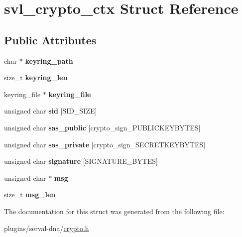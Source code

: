 \hypertarget{structsvl__crypto__ctx}{\section{svl\-\_\-crypto\-\_\-ctx Struct Reference}
\label{structsvl__crypto__ctx}
}
\subsection*{Public Attributes}
\begin{DoxyCompactItemize}
\item 
\hypertarget{structsvl__crypto__ctx_ad8980dd54ef8e577c38f1840a1a1460c}{char $\ast$ {\bfseries keyring\-\_\-path}}\label{structsvl__crypto__ctx_ad8980dd54ef8e577c38f1840a1a1460c}

\item 
\hypertarget{structsvl__crypto__ctx_a5a6d4a9d6a466047528b6c4fb9d408e1}{size\-\_\-t {\bfseries keyring\-\_\-len}}\label{structsvl__crypto__ctx_a5a6d4a9d6a466047528b6c4fb9d408e1}

\item 
\hypertarget{structsvl__crypto__ctx_a7ab514ea2330d07c03e9dd18924b5d3b}{keyring\-\_\-file $\ast$ {\bfseries keyring\-\_\-file}}\label{structsvl__crypto__ctx_a7ab514ea2330d07c03e9dd18924b5d3b}

\item 
\hypertarget{structsvl__crypto__ctx_a56a6ffa4afdbce4b218637cb1e554660}{unsigned char {\bfseries sid} \mbox{[}S\-I\-D\-\_\-\-S\-I\-Z\-E\mbox{]}}\label{structsvl__crypto__ctx_a56a6ffa4afdbce4b218637cb1e554660}

\item 
\hypertarget{structsvl__crypto__ctx_aa073486cf89574d65ef3c0660b3ec9c0}{unsigned char {\bfseries sas\-\_\-public} \mbox{[}crypto\-\_\-sign\-\_\-\-P\-U\-B\-L\-I\-C\-K\-E\-Y\-B\-Y\-T\-E\-S\mbox{]}}\label{structsvl__crypto__ctx_aa073486cf89574d65ef3c0660b3ec9c0}

\item 
\hypertarget{structsvl__crypto__ctx_a3f476ccc11a0c28552877358e6f64d30}{unsigned char {\bfseries sas\-\_\-private} \mbox{[}crypto\-\_\-sign\-\_\-\-S\-E\-C\-R\-E\-T\-K\-E\-Y\-B\-Y\-T\-E\-S\mbox{]}}\label{structsvl__crypto__ctx_a3f476ccc11a0c28552877358e6f64d30}

\item 
\hypertarget{structsvl__crypto__ctx_aa5a5a1490bff146660c77951fc0e2e98}{unsigned char {\bfseries signature} \mbox{[}S\-I\-G\-N\-A\-T\-U\-R\-E\-\_\-\-B\-Y\-T\-E\-S\mbox{]}}\label{structsvl__crypto__ctx_aa5a5a1490bff146660c77951fc0e2e98}

\item 
\hypertarget{structsvl__crypto__ctx_aa3e2e9b87b39af964921175ede10c7e4}{unsigned char $\ast$ {\bfseries msg}}\label{structsvl__crypto__ctx_aa3e2e9b87b39af964921175ede10c7e4}

\item 
\hypertarget{structsvl__crypto__ctx_ab2897ce3e55a5dbd3c13db58cfa4e374}{size\-\_\-t {\bfseries msg\-\_\-len}}\label{structsvl__crypto__ctx_ab2897ce3e55a5dbd3c13db58cfa4e374}

\end{DoxyCompactItemize}


The documentation for this struct was generated from the following file\-:\begin{DoxyCompactItemize}
\item 
plugins/serval-\/dna/\hyperlink{crypto_8h}{crypto.\-h}\end{DoxyCompactItemize}
